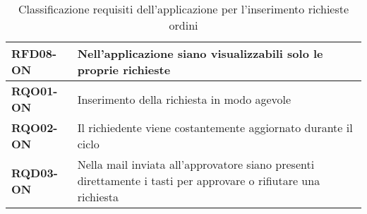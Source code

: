 \begin{table}[H]
\begin{tabular}{ |m{6em}|m{28em}| }
      \hline
      \textbf{RFD08-ON} & Nell'applicazione siano visualizzabili solo le proprie richieste\\
      \hline
      \textbf{RQO01-ON} & Inserimento della richiesta in modo agevole \\
      \hline
      \textbf{RQO02-ON} & Il richiedente viene costantemente aggiornato durante il ciclo\\
      \hline
      \textbf{RQD03-ON} & Nella mail inviata all'approvatore siano presenti direttamente i tasti per approvare o rifiutare una richiesta\\
      \hline
    \end{tabular}
  \caption{Classificazione requisiti dell'applicazione per l'inserimento richieste ordini}
  \label{tab:Requisiti-ON}
  \end{table}
  \renewcommand{\arraystretch}{1.5} %